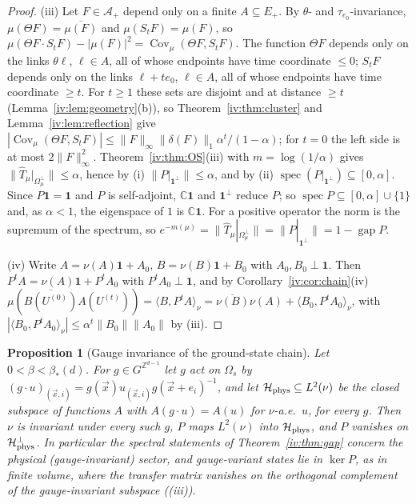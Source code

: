 \documentclass[11pt,a4paper]{article}
\newtheorem{proposition}[theorem]{Proposition}
\theoremstyle{definition}
\theoremstyle{remark}
\DeclareMathOperator{\spec}{spec}
\DeclareMathOperator{\Cov}{Cov}
\DeclareMathOperator{\gap}{gap}
\newcommand{\C}{\mathbb{C}}
\newcommand{\Z}{\mathbb{Z}}
\newcommand{\cH}{\mathcal{H}}
\newcommand{\cA}{\mathcal{A}}
\newcommand{\hT}{\hat{T}}
\newcommand{\ip}[2]{\langle #1,#2\rangle}
\newcommand{\norm}[1]{\lVert #1\rVert}
\newcommand{\Flab}[2]{\cite[#1 \texttt{#2}]{F}}
\newcommand{\bS}{\beta_*}
\begin{document}
\begin{proof}
(iii) Let $F\in\cA_+$ depend only on a finite $A\subseteq E_+$. By $\theta$- and $\tau_{e_0}$-invariance, $\mu(\Theta F)=\overline{\mu(F)}$
and $\mu(S_tF)=\mu(F)$, so $\mu(\Theta F\cdot S_tF)-|\mu(F)|^2=\Cov_\mu(\Theta F,S_tF)$. The function $\Theta F$ depends only on the links
$\theta\ell$, $\ell\in A$, all of whose endpoints have time coordinate $\le0$; $S_tF$ depends only on the links $\ell+te_0$, $\ell\in A$,
all of whose endpoints have time coordinate $\ge t$. For $t\ge1$ these sets are disjoint and at distance $\ge t$
(Lemma~\ref{iv:lem:geometry}(b)), so Theorem~\ref{iv:thm:cluster} and Lemma~\ref{iv:lem:reflection} give
$|\Cov_\mu(\Theta F,S_tF)|\le\norm F_\infty\norm{\delta(F)}_1\alpha^t/(1-\alpha)$; for $t=0$ the left side is at most $2\norm F_\infty^2$.
Theorem~\ref{iv:thm:OS}(iii) with $m=\log(1/\alpha)$ gives $\norm{\hT_\mu|_{\Omega_\mu^\perp}}\le\alpha$, hence by (i)
$\norm{P|_{\mathbf 1^\perp}}\le\alpha$, and by (ii) $\spec(P|_{\mathbf 1^\perp})\subseteq[0,\alpha]$. Since $P\mathbf 1=\mathbf 1$ and $P$ is
self-adjoint, $\C\mathbf 1$ and $\mathbf 1^\perp$ reduce $P$; so $\spec P\subseteq[0,\alpha]\cup\{1\}$ and, as $\alpha<1$, the eigenspace of
$1$ is $\C\mathbf 1$. For a positive operator the norm is the supremum of the spectrum, so
$e^{-m(\mu)}=\norm{\hT_\mu|_{\Omega_\mu^\perp}}=\norm{P|_{\mathbf 1^\perp}}=1-\gap P$.

(iv) Write $A=\nu(A)\mathbf 1+A_0$, $B=\nu(B)\mathbf 1+B_0$ with $A_0,B_0\perp\mathbf 1$. Then $P^tA=\nu(A)\mathbf 1+P^tA_0$ with
$P^tA_0\perp\mathbf 1$, and by Corollary~\ref{iv:cor:chain}(iv)
$\mu(\overline{B(U^{(0)})}A(U^{(t)}))=\ip B{P^tA}_\nu=\overline{\nu(B)}\nu(A)+\ip{B_0}{P^tA_0}_\nu$, with
$|\ip{B_0}{P^tA_0}_\nu|\le\alpha^t\norm{B_0}\norm{A_0}$ by (iii).
\end{proof}

\begin{proposition}[Gauge invariance of the ground-state chain]\label{iv:prop:phys}
Let $0<\beta<\bS(d)$. For $g\in G^{\Z^{d-1}}$ let $g$ act on $\Omega_s$ by $(g\cdot u)_{(\vec x,i)}=g(\vec x)u_{(\vec x,i)}g(\vec x+e_i)^{-1}$,
and let $\cH_{\rm phys}\subseteq L^2(\nu)$ be the closed subspace of functions $A$ with $A(g\cdot u)=A(u)$ for $\nu$-a.e.\ $u$, for every
$g$. Then $\nu$ is invariant under every such $g$, $P$ maps $L^2(\nu)$ into $\cH_{\rm phys}$, and $P$ vanishes on $\cH_{\rm phys}^\perp$. In
particular the spectral statements of Theorem~\ref{iv:thm:gap} concern the physical (gauge-invariant) sector, and gauge-variant states
lie in $\ker P$, as in finite volume, where the transfer matrix vanishes on the orthogonal complement of the gauge-invariant
subspace (\Flab{Lemma}{lem:K}(iii)).
\end{proposition}
\end{document}
